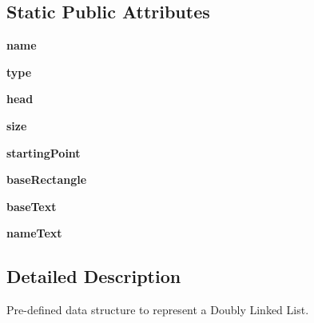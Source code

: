 \subsection*{Static Public Attributes}
\begin{DoxyCompactItemize}
\item 
\mbox{\label{class_doubly_linked_list_1_1_doubly_linked_list_a26853daafc391bd587f107a9c0dc1bba}} 
{\bfseries name}
\item 
\mbox{\label{class_doubly_linked_list_1_1_doubly_linked_list_a80c673460ed3af11abe95cd4e85b1f91}} 
{\bfseries type}
\item 
\mbox{\label{class_doubly_linked_list_1_1_doubly_linked_list_a65b96bdcab9dce5cfbf2a41dbbdc5546}} 
{\bfseries head}
\item 
\mbox{\label{class_doubly_linked_list_1_1_doubly_linked_list_a98853cf7fc91a4f1b7b96f78f6fed012}} 
{\bfseries size}
\item 
\mbox{\label{class_doubly_linked_list_1_1_doubly_linked_list_a6e87e75da192e13766024f5b9328707d}} 
{\bfseries starting\+Point}
\item 
\mbox{\label{class_doubly_linked_list_1_1_doubly_linked_list_a24d3c87c1fc5677506ce69a959830442}} 
{\bfseries base\+Rectangle}
\item 
\mbox{\label{class_doubly_linked_list_1_1_doubly_linked_list_a2fb4ea93e60d8e8b0c0f05c41400e377}} 
{\bfseries base\+Text}
\item 
\mbox{\label{class_doubly_linked_list_1_1_doubly_linked_list_a64a7ed0e22b06511979417b2d7626709}} 
{\bfseries name\+Text}
\end{DoxyCompactItemize}


\subsection{Detailed Description}
Pre-\/defined data structure to represent a Doubly Linked List. 

